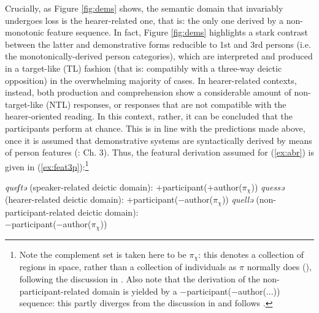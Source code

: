 \documentclass[output=paper]{langscibook}
\begin{document}
Crucially, as Figure \ref{fig:dems} shows, the semantic domain that invariably undergoes loss is the hearer-related one, that is: the only one derived by a non-monotonic feature sequence. In fact, Figure \ref{fig:dems} highlights a stark contrast between the latter and demonstrative forms reducible to 1st and 3rd persons (i.e. the monotonically-derived person categories), which are interpreted and produced in a target-like (TL) fashion (that is: compatibly with a three-way deictic opposition) in the overwhelming majority of cases. In hearer-related contexts, instead, both production and comprehension show a considerable amount of non-target-like (NTL) responses, or responses that are not compatible with the hearer-oriented reading. In this context, rather, it can be concluded that the participants perform at chance. This is in line with the predictions made above, once it is assumed that demonstrative systems are syntactically derived by means of person features (\citealt{Harbour2016, BjorkmanEtAl2019, CowperHall2019b, Terenghi2021WCCFL39, Terenghi2023}: Ch. 3). Thus, the featural derivation assumed for (\ref{ex:abr}) is given in (\ref{ex:feat3p}):\footnote{Note the complement set is taken here to be $\pi_{\chi}$: this denotes a collection of regions in space, rather than a collection of individuals as $\pi$ normally does (\citealt{Harbour2016}), following the discussion in \textcites[]{Terenghi2021WCCFL39}[93--94]{Terenghi2023}. Also note that the derivation of the non-participant-related domain is yielded by a $-$participant($-$author(...)) sequence: this partly diverges from the discussion in \citet[92ff.]{Harbour2016} and follows \citet[187]{Terenghi2023}.}

\begin{exe}
\ex \label{ex:feat3p}
\begin{xlist}
\ex \textit{queʃtə} (speaker-related deictic domain): \hfill $+$participant($+$author($\pi_{\chi}$))
\ex \textit{quessə} (hearer-related deictic domain): \hfill $+$participant($-$author($\pi_{\chi}$))
\ex \textit{quellə} (non-participant-related deictic domain): \\ \hbox{} \hfill $-$participant($-$author($\pi_{\chi}$))
\end{xlist}
\end{exe}
\end{document}
